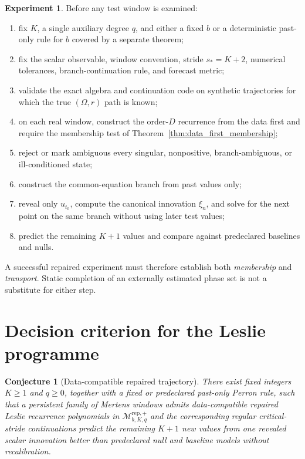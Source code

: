 \documentclass[11pt]{amsart}
\numberwithin{equation}{section}
\theoremstyle{plain}
\newtheorem{conjecture}[theorem]{Conjecture}
\theoremstyle{definition}
\newtheorem{experiment}[theorem]{Experiment}
\theoremstyle{remark}
\begin{document}
\begin{experiment}
\label{exp:repaired_causal_protocol}
Before any test window is examined:
\begin{enumerate}
\item fix $K$, a single auxiliary degree $q$, and either a fixed $b$ or a deterministic past-only rule for $b$ covered by a separate theorem;
\item fix the scalar observable, window convention, stride $s_*=K+2$, numerical tolerances, branch-continuation rule, and forecast metric;
\item validate the exact algebra and continuation code on synthetic trajectories for which the true $(\Omega,r)$ path is known;
\item on each real window, construct the order-$D$ recurrence from the data first and require the membership test of Theorem~\ref{thm:data_first_membership};
\item reject or mark ambiguous every singular, nonpositive, branch-ambiguous, or ill-conditioned state;
\item construct the common-equation branch from past values only;
\item reveal only $u_{t_0}$, compute the canonical innovation $\xi_n$, and solve for the next point on the same branch without using later test values;
\item predict the remaining $K+1$ values and compare against predeclared baselines and nulls.
\end{enumerate}
\end{experiment}

A successful repaired experiment must therefore establish both \emph{membership} and \emph{transport}. Static completion of an externally estimated phase set is not a substitute for either step.

\section{Decision criterion for the Leslie programme}
\label{sec:decision_criterion}

\begin{conjecture}[Data-compatible repaired trajectory]
\label{conj:transportable_trajectory_v7}
There exist fixed integers $K\geq1$ and $q\geq0$, together with a fixed or predeclared past-only Perron rule, such that a persistent family of Mertens windows admits data-compatible repaired Leslie recurrence polynomials in $\mathcal M^{\mathrm{rep},+}_{b,K,q}$ and the corresponding regular critical-stride continuations predict the remaining $K+1$ new values from one revealed scalar innovation better than predeclared null and baseline models without recalibration.
\end{conjecture}
\end{document}
